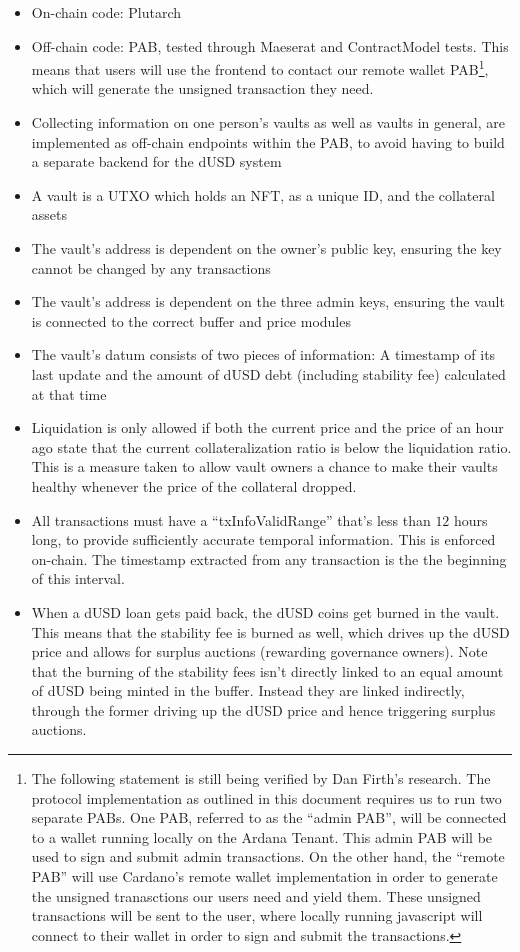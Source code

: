 \documentclass{article} %
\begin{document}
\begin{itemize}
  \item On-chain code: Plutarch
  \item Off-chain code: PAB, tested through Maeserat and ContractModel tests.
    This means that users will use the frontend to contact our remote wallet
    PAB\footnote{
      The following statement is still being verified by Dan Firth's research.
      The protocol implementation as outlined in this document requires us to
      run two separate PABs.
      One PAB, referred to as the ``admin PAB'', will be connected to a wallet
      running locally on the Ardana Tenant.
      This admin PAB will be used to sign and submit admin transactions.
      On the other hand, the ``remote PAB'' will use Cardano's remote wallet
      implementation in order to generate the unsigned tranasctions our users
      need and yield them.
      These unsigned transactions will be sent to the user, where locally
      running javascript will connect to their wallet in order to sign and
      submit the transactions.
    }, which will generate the unsigned transaction they need.
  \item Collecting information on one person's vaults as well as vaults in
    general, are implemented as off-chain endpoints within the PAB, to avoid
    having to build a separate backend for the dUSD system
  \item A vault is a UTXO which holds an NFT, as a unique ID, and the collateral
    assets
  \item The vault's address is dependent on the owner's public key, ensuring the
    key cannot be changed by any transactions
  \item The vault's address is dependent on the three admin keys, ensuring the
    vault is connected to the correct buffer and price modules
  \item The vault's datum consists of two pieces of information: A timestamp of
    its last update and the amount of dUSD debt (including stability fee)
    calculated at that time
  \item Liquidation is only allowed if both the current price and the price of
    an hour ago state that the current collateralization ratio is below the
    liquidation ratio.
    This is a measure taken to allow vault owners a chance to make their vaults
    healthy whenever the price of the collateral dropped.
  \item All transactions must have a ``txInfoValidRange'' that's less than $12$
    hours long, to provide sufficiently accurate temporal information. This is
    enforced on-chain. The timestamp extracted from any transaction is the the
    beginning of this interval.
  \item When a dUSD loan gets paid back, the dUSD coins get burned in the vault.
    This means that the stability fee is burned as well, which drives up the
    dUSD price and allows for surplus auctions (rewarding governance owners).
    Note that the burning of the stability fees isn't directly linked to an
    equal amount of dUSD being minted in the buffer.
    Instead they are linked indirectly, through the former driving up the dUSD
    price and hence triggering surplus auctions.
\end{itemize}
\end{document}
